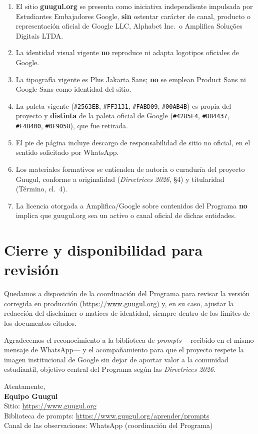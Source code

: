 \documentclass[11pt,a4paper]{article}
\begin{document}
\begin{enumerate}[leftmargin=*]
  \item El sitio \textbf{guugul.org} se presenta como iniciativa independiente impulsada por Estudiantes Embajadores Google, \textbf{sin} ostentar carácter de canal, producto o representación oficial de Google LLC, Alphabet Inc.\ o Amplifica Soluções Digitais LTDA.
  \item La identidad visual vigente \textbf{no} reproduce ni adapta logotipos oficiales de Google.
  \item La tipografía vigente es Plus Jakarta Sans; \textbf{no} se emplean Product Sans ni Google Sans como identidad del sitio.
  \item La paleta vigente (\texttt{\#2563EB}, \texttt{\#FF3131}, \texttt{\#FABD09}, \texttt{\#00AB4B}) es propia del proyecto y \textbf{distinta} de la paleta oficial de Google (\texttt{\#4285F4}, \texttt{\#DB4437}, \texttt{\#F4B400}, \texttt{\#0F9D58}), que fue retirada.
  \item El pie de página incluye descargo de responsabilidad de sitio no oficial, en el sentido solicitado por WhatsApp.
  \item Los materiales formativos se entienden de autoría o curaduría del proyecto Guugul, conforme a originalidad (\emph{Directrices 2026}, §4) y titularidad (Término, cl.~4).
  \item La licencia otorgada a Amplifica/Google sobre contenidos del Programa \textbf{no} implica que guugul.org sea un activo o canal oficial de dichas entidades.
\end{enumerate}

\section{Cierre y disponibilidad para revisión}

Quedamos a disposición de la coordinación del Programa para revisar la versión corregida en producción (\url{https://www.guugul.org}) y, en su caso, ajustar la redacción del disclaimer o matices de identidad, siempre dentro de los límites de los documentos citados.

Agradecemos el reconocimiento a la biblioteca de \emph{prompts} ---recibido en el mismo mensaje de WhatsApp--- y el acompañamiento para que el proyecto respete la imagen institucional de Google sin dejar de aportar valor a la comunidad estudiantil, objetivo central del Programa según las \emph{Directrices 2026}.

\vspace{1.5em}
\noindent
Atentamente,\\[0.8em]
\textbf{Equipo Guugul}\\
Sitio: \url{https://www.guugul.org}\\
Biblioteca de prompts: \url{https://www.guugul.org/aprender/prompts}\\
Canal de las observaciones: WhatsApp (coordinación del Programa)
\end{document}
